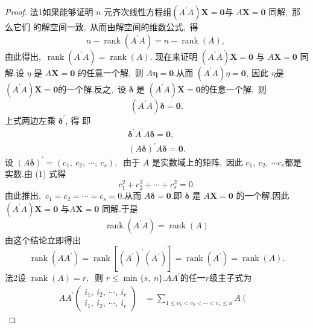 \begin{proof}
	法1如果能够证明 $ n$  元齐次线性方程组$  \left(A^{\prime} A\right) \boldsymbol{X}=\mathbf{0}  $与  $A \boldsymbol{X}=\mathbf{0}$  同解,\  那么它们 的解空间一致,\  从而由解空间的维数公式,\  得
	$$n-\operatorname{rank}\left(A^{\prime} A\right)=n-\operatorname{rank}(A),\ $$
	由此得出,\   $\operatorname{rank}\left(A^{\prime} A\right)=\operatorname{rank}(A) .$
	现在来证明 $ \left(A^{\prime} A\right) \boldsymbol{X}=\mathbf{0}$ 与  $A \boldsymbol{X}=\mathbf{0} $ 同解.设  $\eta $ 是 $ A \boldsymbol{X}=\mathbf{0} $ 的任意一个解,\  则  $A \boldsymbol{\eta}=\mathbf{0} .$从而 $ \left(A^{\prime} A\right) \eta=\mathbf{0} ,\  $因此 $ \eta  $是 $ \left(A^{\prime} A\right) \boldsymbol{X}=\mathbf{0}  $的一个解.反之,\  设 $\boldsymbol{\delta} $ 是  $\left(A^{\prime} A\right) \boldsymbol{X}=\mathbf{0}  $的任意一个解,\  则
	$$\left(A^{\prime} A\right) \boldsymbol{\delta}=\mathbf{0}.$$
	上式两边左乘 $ \boldsymbol{\delta}^{\prime} ,\  $得
	即
	$$\begin{array}{l}
		\boldsymbol{\delta}^{\prime} A^{\prime} A \boldsymbol{\delta}=\mathbf{0},\  \\
		(A \boldsymbol{\delta})^{\prime} A \boldsymbol{\delta}=\mathbf{0} .
	\end{array}$$
	设 $ (A \boldsymbol{\delta})^{\prime}=\left(c_{1},\  c_{2},\  \cdots,\  c_{s}\right) ,\ $
	由于 $ A $ 是实数域上的矩阵,\  因此 $ c_{1},\  c_{2},\  \cdots c_{s}  $都是实数.由 (1) 式得
	$$c_{1}^{2}+c_{2}^{2}+\cdots+c_{s}^{2}=0 .$$
	由此推出,\  $ c_{1}=c_{2}=\cdots=c_{s}=0 .$从而 $ A \boldsymbol{\delta}=\mathbf{0} .$即 $ \boldsymbol{\delta} $ 是 $ A \boldsymbol{X}=\mathbf{0}$  的一个解.因此  $\left(A^{\prime} A\right) \boldsymbol{X}=\mathbf{0} $ 与$  A \mathbf{X}=\mathbf{0}$ 同解.于是
	$$\operatorname{rank}\left(A^{\prime} A\right)=\operatorname{rank}(A)$$
	由这个结论立即得出
	$$\operatorname{rank}\left(A A^{\prime}\right)=\operatorname{rank}\left[\left(A^{\prime}\right)^{\prime}\left(A^{\prime}\right)\right]=\operatorname{rank}\left(A^{\prime}\right)=\operatorname{rank}(A) .$$
	法2设  $\operatorname{rank}(A)=r ,\ $ 则  $r \leqslant \min \{s,\  n\}. A A^{\prime}  $的任一$  r  $级主子式为
	$$\begin{aligned}
		A A^{\prime}\left(\begin{array}{l}
			i_{1},\  i_{2},\  \cdots,\  i_{r} \\
			i_{1},\  i_{2},\  \cdots,\  i_{r}
		\end{array}\right) & =\sum_{1 \leqslant v_{1}<v_{2}<\cdots<v_{r} \leqslant n} A\left(\begin{array}{l}

\end{array}
\end{aligned}$$
\end{proof}
